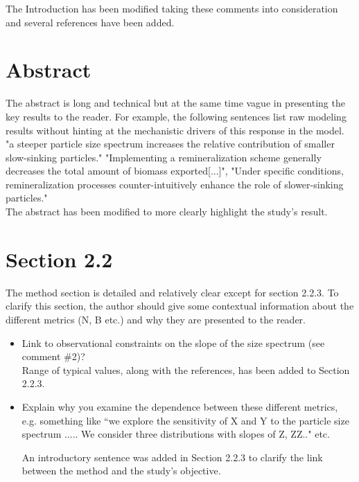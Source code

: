 \documentclass[12pt,letter]{article}
\begin{document}
{\color{blue} The Introduction has been modified taking these comments into consideration and several references have been added.}

\section*{Abstract}
The abstract is long and technical but at the same time vague in presenting the key results to the reader. For example, the following sentences list raw modeling results without hinting at the mechanistic drivers of this response in the model.
"a steeper particle size spectrum increases the relative contribution of smaller slow-sinking particles." "Implementing a remineralization scheme generally decreases the total amount of biomass exported[...]", "Under specific conditions, remineralization processes counter-intuitively enhance the role of slower-sinking particles."\\

{\color{blue}The abstract has been modified to more clearly highlight the study's result.\\}

\section*{Section 2.2}
The method section is detailed and relatively clear except for section 2.2.3. To clarify this section, the author should give some contextual information about the different metrics (N, B etc.) and why they are presented to the reader.
\begin{itemize}
	\item Link to observational constraints on the slope of the size spectrum (see comment \#2)?\\
	{\color{blue} Range of typical values, along with the references, has been added to Section 2.2.3.\\}

	\item Explain why you examine the dependence between these different metrics, e.g. something like ``we explore the sensitivity of X and Y to the particle size spectrum ..... We consider three distributions with slopes of Z, ZZ.." etc.

		{\color{blue} An introductory sentence was added in Section 2.2.3 to clarify the link between the method and the study's objective.\\}
\end{itemize}
\end{document}
